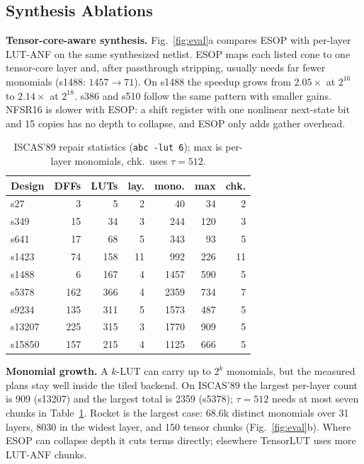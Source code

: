\documentclass[sigconf]{acmart}
\begin{document}
\subsection{Synthesis Ablations}\label{sec:mono}
\textbf{Tensor-core-aware synthesis.} Fig.~\ref{fig:eval}a compares ESOP with per-layer LUT-ANF on
the same synthesized netlist. ESOP maps each listed cone to one tensor-core layer and, after
passthrough stripping, usually needs far fewer monomials (s1488: $1457\to71$). On s1488 the speedup
grows from $2.05\times$ at $2^{16}$ to $2.14\times$ at $2^{18}$. s386 and s510 follow the same
pattern with smaller gains. NFSR16 is slower with ESOP: a shift register with one nonlinear
next-state bit and 15 copies has no depth to collapse, and ESOP only adds gather overhead.

\begin{table}[tb]
\centering\small
\caption{ISCAS'89 repair statistics (\texttt{abc -lut 6}); max is per-layer monomials, chk.\ uses
$\tau=512$.}
\label{tab:designs}
\setlength{\tabcolsep}{0pt}
\begin{tabular*}{\columnwidth}{@{\extracolsep{\fill}}lrrrrrr@{}}
\toprule
Design & DFFs & LUTs & lay. & mono. & max & chk.\\
\midrule
s27    & 3   & 5   & 2  & 40   & 34  & 2\\
s349   & 15  & 34  & 3  & 244  & 120 & 3\\
s641   & 17  & 68  & 5  & 343  & 93  & 5\\
s1423  & 74  & 158 & 11 & 992  & 226 & 11\\
s1488  & 6   & 167 & 4  & 1457 & 590 & 5\\
s5378  & 162 & 366 & 4  & 2359 & 734 & 7\\
s9234  & 135 & 311 & 5  & 1573 & 487 & 5\\
s13207 & 225 & 315 & 3  & 1770 & 909 & 5\\
s15850 & 157 & 215 & 4  & 1125 & 666 & 5\\
\bottomrule
\end{tabular*}
\end{table}

\textbf{Monomial growth.} A $k$-LUT can carry up to $2^k$ monomials, but the measured plans stay well
inside the tiled backend. On ISCAS'89 the largest per-layer count is 909 (s13207) and the largest
total is 2359 (s5378); $\tau=512$ needs at most seven chunks in Table~\ref{tab:designs}. Rocket is
the largest case: 68.6k distinct monomials over 31 layers, 8030 in the widest layer, and 150 tensor
chunks (Fig.~\ref{fig:eval}b). Where ESOP can collapse depth it cuts terms directly; elsewhere
TensorLUT uses more LUT-ANF chunks.
\end{document}
